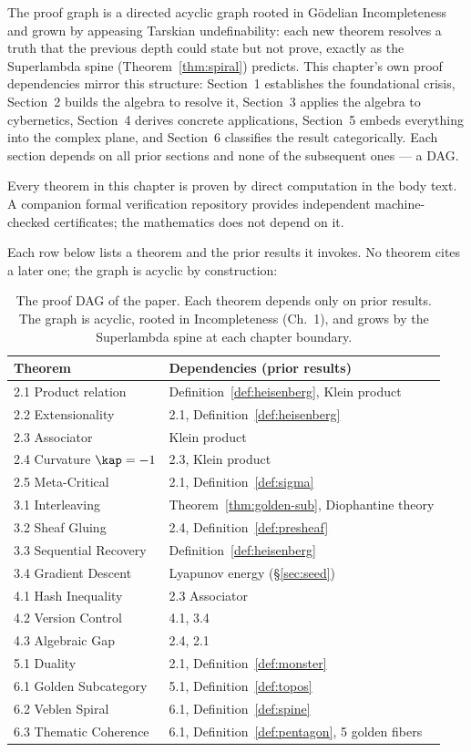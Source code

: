 The proof graph is a directed acyclic graph rooted in G\"odelian Incompleteness and grown by appeasing Tarskian undefinability: each new theorem resolves a truth that the previous depth could state but not prove, exactly as the Superlambda spine (Theorem~\ref{thm:spiral}) predicts. This chapter's own proof dependencies mirror this structure: Section~1 establishes the foundational crisis, Section~2 builds the algebra to resolve it, Section~3 applies the algebra to cybernetics, Section~4 derives concrete applications, Section~5 embeds everything into the complex plane, and Section~6 classifies the result categorically. Each section depends on all prior sections and none of the subsequent ones --- a DAG.

Every theorem in this chapter is proven by direct computation in the body text. A companion formal verification repository provides independent machine-checked certificates; the mathematics does not depend on it.

Each row below lists a theorem and the prior results it invokes. No theorem cites a later one; the graph is acyclic by construction:

\begin{table}[!ht]
\centering\small
\begin{tabular}{@{}lp{8cm}@{}}
\toprule
\textbf{Theorem} & \textbf{Dependencies (prior results)} \\
\midrule
2.1 Product relation & Definition~\ref{def:heisenberg}, Klein product \\
2.2 Extensionality & 2.1, Definition~\ref{def:heisenberg} \\
2.3 Associator & Klein product \\
2.4 Curvature $\kap = -1$ & 2.3, Klein product \\
2.5 Meta-Critical & 2.1, Definition~\ref{def:sigma} \\
3.1 Interleaving & Theorem~\ref{thm:golden-sub}, Diophantine theory \\
3.2 Sheaf Gluing & 2.4, Definition~\ref{def:presheaf} \\
3.3 Sequential Recovery & Definition~\ref{def:heisenberg} \\
3.4 Gradient Descent & Lyapunov energy (\S\ref{sec:seed}) \\
4.1 Hash Inequality & 2.3 Associator \\
4.2 Version Control & 4.1, 3.4 \\
4.3 Algebraic Gap & 2.4, 2.1 \\
5.1 Duality & 2.1, Definition~\ref{def:monster} \\
6.1 Golden Subcategory & 5.1, Definition~\ref{def:topos} \\
6.2 Veblen Spiral & 6.1, Definition~\ref{def:spine} \\
6.3 Thematic Coherence & 6.1, Definition~\ref{def:pentagon}, 5 golden fibers \\
\bottomrule
\end{tabular}
\caption{The proof DAG of the paper. Each theorem depends only on prior results. The graph is acyclic, rooted in Incompleteness (Ch.~1), and grows by the Superlambda spine at each chapter boundary.}
\end{table}

